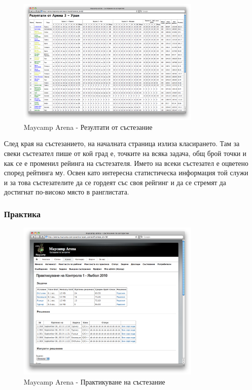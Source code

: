 \documentclass[a4paper,12pt]{article}
\begin{document}
  \begin{figure}[ht]
    \begin{center}
      \includegraphics[width=0.8\textwidth]{maycamp_arena_results.png}
    \end{center}
    \caption{Maycamp Arena - Резултати от състезание}
    \label{arena_results}
  \end{figure}
  
  След края на състезанието, на началната страница излиза класирането. Там за свеки състезател пише от кой град е, точките на всяка задача, общ брой точки и как се е променил рейинга на състезателя. Името на всеки състезател е оцветено според рейтинга му. Освен като интересна статистическа информация той служи и за това състезателите да се гордеят със своя рейгинг и да се стремят да достигнат по-високо място в ранглистата.
  
  \pagebreak

  \subsubsection{Практика}

  \begin{figure}[ht]
    \begin{center}
      \includegraphics[width=0.8\textwidth]{maycamp_arena_practice.png}
    \end{center}
    \caption{Maycamp Arena - Практикуване на състезание}
    \label{arena_practice}
  \end{figure}
  
\end{document}
